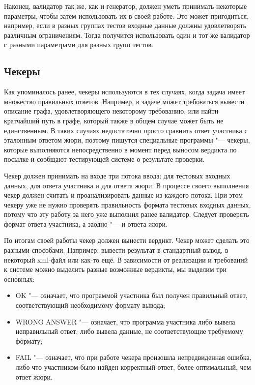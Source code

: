 Наконец, валидатор так же, как и генератор, должен уметь принимать некоторые параметры, чтобы затем использовать их в своей работе. Это может пригодиться, например, если в разных группах тестов входные данные должны удовлетворять различным ограничениям. Тогда получится использовать один и тот же валидатор с разными параметрами для разных групп тестов.

\subsection*{Чекеры}

Как упоминалось ранее, чекеры используются в тех случаях, когда задача имеет множество правильных ответов. Например, в задаче может требоваться вывести описание графа, удовлетворяющего некоторому требованию, или найти кратчайший путь в графе, который также в общем случае может быть не единственным. В таких случаях недостаточно просто сравнить ответ участника с эталонным ответом жюри, поэтому пишутся специальные программы "--- чекеры, которые выполняются непосредственно в момент перед выносом вердикта по посылке и сообщают тестирующей системе о результате проверки.

Чекер должен принимать на входе три потока ввода: для тестовых входных данных, для ответа участника и для ответа жюри. В процессе своего выполнения чекер должен считать и проанализировать данные из каждого потока. При этом чекеру уже не нужно проверять правильность формата тестовых входных данных, потому что эту работу за него уже выполнил ранее валидатор. Следует проверять формат ответа участника, а заодно "--- и ответа жюри.

По итогам своей работы чекер должен вынести вердикт. Чекер может сделать это разными способами. Например, вывести результат в стандартный вывод, в некоторый xml-файл или как-то ещё. В зависимости от реализации и требований к системе можно выделить разные возможные вердикты, мы выделим три основных:

\begin{itemize}
\item OK "--- означает, что программой участника был получен правильный ответ, соответствующий необходимому формату вывода;
\item WRONG ANSWER "--- означает, что программа участника либо вывела неправильный ответ, либо вывела данные, не соответствующие требуемому формату;
\item FAIL "--- означает, что при работе чекера произошла непредвиденная ошибка, либо что участником было найден корректный ответ, более оптимальный, чем ответ жюри.
\end{itemize}

